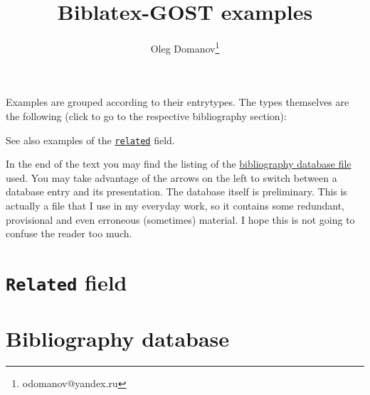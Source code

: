 \documentclass[a4paper,10pt]{article}
\title{Biblatex-GOST examples}
\author{Oleg Domanov\thanks{odomanov@yandex.ru}}
\edef\mytempforAtCharacter{\char64}
\def\getkey#1#2{%
  \csappto{mytempforbibkey}{#1}%
  \ifstrequal{#2}{,}
  {\hspace{-4em}\makebox[4em]{\hyperlink{back:\mytempforbibkey}{$\Uparrow$}}%
   \raisebox{\baselineskip}{\hypertarget{\mytempforbibkey}{}}%
   \mytempforAtCharacter\mytempforbibtype\{\mytempforbibkey,}
  {\getkey#2}%
}
\renewcommand*{\do}[1]{\csdef{#1}##1{\def\mytempforbibtype{#1}\def\mytempforbibkey{}\getkey}}
\renewcommand*{\do}[1]{\csdef{#1}##1{\mytempforAtCharacter #1\{}}
\begin{document}
\maketitle
Examples are grouped according to their entrytypes. The types themselves are the following
(click to go to the respective bibliography section):
\renewcommand*{\do}[1]{\hyperref[#1]{@#1}\\}
\begin{multicols}{5}
\noindent%
\end{multicols}

See also examples of the \hyperref[related]{\texttt{related}} field.

In the end of the text you may find the listing of the
\hyperref[bibfile]{bibliography database file} used.
You may take advantage of
the arrows on the left to switch between a database entry and its presentation.
The database itself is preliminary. This is actually a file that I use in my everyday work,
so it contains some redundant, provisional and even erroneous (sometimes) material.
I hope this is not going to confuse the reader too much.

\nocite{*}

\renewcommand*{\do}[1]{\section{@#1\label{#1}}\printbibliography[type=#1]}

  {\hspace{-4em}}%

\section{\texttt{Related} field\label{related}}
\printbibliography[check=related]

\section{Bibliography database\label{bibfile}}
\end{document}
